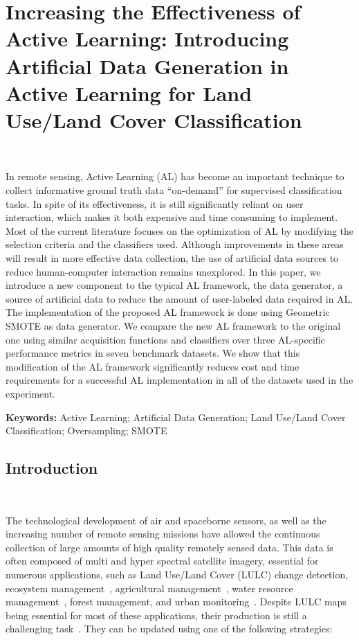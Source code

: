 \chapter{%
    Increasing the Effectiveness of Active Learning: Introducing Artificial
    Data Generation in Active Learning for Land Use/Land Cover
    Classification
}~\label{chp:al-generator-lulc}


\graphicspath{{figures/al-generator-lulc/}}

\begin{adjustwidth}{30pt}{30pt}

    In remote sensing, Active Learning (AL) has become an important technique
    to collect informative ground truth data ``on-demand'' for supervised
    classification tasks. In spite of its effectiveness, it is still
    significantly reliant on user interaction, which makes it both expensive
    and time consuming to implement. Most of the current literature focuses on
    the optimization of AL by modifying the selection criteria and the
    classifiers used. Although improvements in these areas will result in more
    effective data collection, the use of artificial data sources to reduce
    human-computer interaction remains unexplored. In this paper, we introduce
    a new component to the typical AL framework, the data generator, a source
    of artificial data to reduce the amount of user-labeled data required in
    AL\@. The implementation of the proposed AL framework is done using
    Geometric SMOTE as data generator. We compare the new AL framework to the
    original one using similar acquisition functions and classifiers over
    three AL-specific performance metrics in seven benchmark datasets. We show
    that this modification of the AL framework significantly reduces cost and
    time requirements for a successful AL implementation in all of the
    datasets used in the experiment. 

\end{adjustwidth}

\vspace{.5cm}
\textbf{Keywords:} Active Learning; Artificial Data Generation; Land Use/Land Cover Classification;  Oversampling; SMOTE

\section{Introduction}~\label{sec:introduction-al-generator}

The technological development of air and spaceborne sensors, as well as the
increasing number of remote sensing missions have allowed the continuous
collection of large amounts of high quality remotely sensed data. This data is
often composed of multi and hyper spectral satellite imagery, essential for
numerous applications, such as Land Use/Land Cover (LULC) change detection,
ecosystem management~\cite{Nagai2020}, agricultural
management~\cite{Huang2018}, water resource management~\cite{Wang2018}, forest
management, and urban monitoring~\cite{Khatami2016}. Despite LULC maps being
essential for most of these applications, their production is still a
challenging task~\cite{Gavade2019, Wulder2018}. They can be updated using one
of the following strategies:

